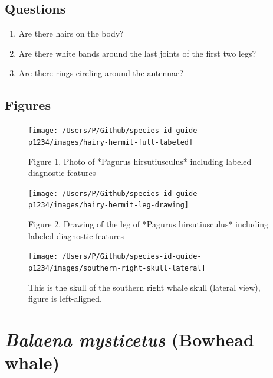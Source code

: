 \documentclass[
]{article}
\providecommand{\tightlist}{%
  \setlength{\itemsep}{0pt}\setlength{\parskip}{0pt}}
\begin{document}
\hypertarget{questions}{%
\subsection{Questions}\label{questions}}

\begin{enumerate}
\def\labelenumi{\arabic{enumi}.}
\tightlist
\item
  Are there hairs on the body?
\item
  Are there white bands around the last joints of the first two legs?
\item
  Are there rings circling around the antennae?
\end{enumerate}

\newpage

\hypertarget{figures}{%
\subsection{Figures}\label{figures}}

\begin{figure}

\texttt{[image: /Users/P/Github/species-id-guide-p1234/images/hairy-hermit-full-labeled]} \hfill{}

\caption{Figure 1. Photo of *Pagurus hirsutiusculus* including labeled diagnostic features}\label{fig:southern-right-whale}
\end{figure}

\begin{figure}

\texttt{[image: /Users/P/Github/species-id-guide-p1234/images/hairy-hermit-leg-drawing]} \hfill{}

\caption{Figure 2. Drawing of the leg of *Pagurus hirsutiusculus* including labeled diagnostic features}\label{fig:southern-right-whale-skull}
\end{figure}

\begin{figure}

\texttt{[image: /Users/P/Github/species-id-guide-p1234/images/southern-right-skull-lateral]} \hfill{}

\caption{This is the skull of the southern right whale skull (lateral view), figure is left-aligned.}\label{fig:southern-right-whale-skull-lateral}
\end{figure}

\newpage

\hypertarget{balaena-mysticetus-bowhead-whale}{%
\section{\texorpdfstring{\emph{Balaena mysticetus} (Bowhead
whale)}{Balaena mysticetus (Bowhead whale)}}\label{balaena-mysticetus-bowhead-whale}}
\end{document}
